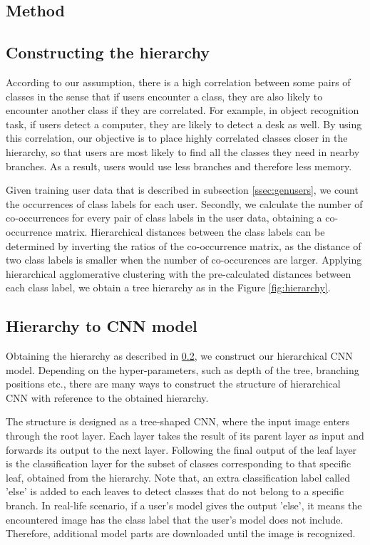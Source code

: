 \subsection{Method}



\subsection{Constructing the hierarchy}
\label{ssec:hierarchy}

According to our assumption, there is a high correlation between some pairs of classes in the sense that 
if users encounter a class, they are also likely to encounter another class if they are correlated. 
For example, in object recognition task, if users detect a computer, they are likely to detect a desk as well. 
By using this correlation, our objective is to place highly correlated classes closer in the hierarchy, 
so that users are most likely to find all the classes they need in nearby branches. 
As a result, users would use less branches and therefore less memory.

Given training user data that is described in subsection \ref{ssec:genusers}, we count the occurrences of class labels for each user. 
Secondly, we calculate the number of co-occurrences for every pair of class labels in the user data, obtaining a co-occurrence matrix.
Hierarchical distances between the class labels can be determined by inverting the ratios of the co-occurrence matrix, 
as the distance of two class labels is smaller when the number of co-occurences are larger. 
Applying hierarchical agglomerative clustering with the pre-calculated distances between each class label, we obtain a tree hierarchy as in the Figure \ref{fig:hierarchy}.

\subsection{Hierarchy to CNN model}
\label{ssec:hiertoCNN}

Obtaining the hierarchy as described in \ref{ssec:hierarchy}, we construct our hierarchical CNN model. Depending on the hyper-parameters, such as depth of the tree, branching positions etc., there are many ways to construct the structure of hierarchical CNN with reference to the obtained hierarchy.

The structure is designed as a tree-shaped CNN, where the input image enters through the root layer.
Each layer takes the result of its parent layer as input and forwards its output to the next layer. 
Following the final output of the leaf layer is the classification layer for the subset of classes corresponding to that specific leaf, obtained from the hierarchy.
Note that, an extra classification label called 'else' is added to each leaves to detect classes that do not belong to a specific branch.
In real-life scenario, if a user's model gives the output 'else', it means the encountered image has the class label that the user's model does not include.  
Therefore, additional model parts are downloaded until the image is recognized.

